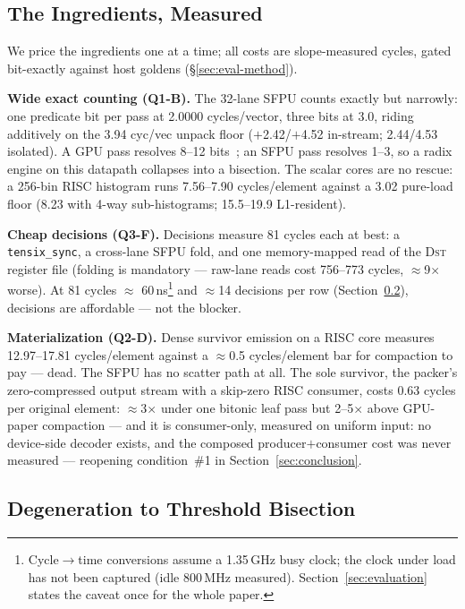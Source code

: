 \subsection{The Ingredients, Measured}
\label{sec:dspace-ingredients}

We price the ingredients one at a time; all costs are slope-measured
cycles, gated bit-exactly against host goldens (\S\ref{sec:eval-method}).

\textbf{Wide exact counting (Q1-B).}
The 32-lane SFPU counts exactly but narrowly: one predicate bit per pass
at 2.0000 cycles/vector, three bits at 3.0, riding additively on the 3.94
cyc/vec unpack floor ($+$2.42/$+$4.52 in-stream; 2.44/4.53 isolated). A
GPU pass
resolves 8--12 bits~\cite{alabi2012kselection,li2024radik}; an SFPU pass
resolves 1--3, so a radix engine on this datapath collapses into a
bisection. The scalar cores are no rescue: a 256-bin RISC histogram runs
7.56--7.90 cycles/element against a 3.02 pure-load floor (8.23 with
4-way sub-histograms; 15.5--19.9 L1-resident).

\textbf{Cheap decisions (Q3-F).}
Decisions measure 81 cycles each at best: a \texttt{tensix\_sync}, a
cross-lane SFPU fold, and one memory-mapped read of the \textsc{Dst}
register file (folding is mandatory --- raw-lane reads cost 756--773
cycles, $\approx$9$\times$ worse). At 81 cycles $\approx$ 60\,ns\footnote{%
Cycle$\to$time conversions assume a 1.35\,GHz busy clock; the clock under
load has not been captured (idle 800\,MHz measured).
Section~\ref{sec:evaluation} states the caveat once for the whole paper.}
and $\approx$14 decisions per row
(Section~\ref{sec:dspace-bisection}), decisions are affordable --- not
the blocker.

\textbf{Materialization (Q2-D).}
Dense survivor emission on a RISC core measures 12.97--17.81
cycles/element against a $\approx$0.5 cycles/element bar for compaction to
pay --- dead. The SFPU has no scatter path at all. The sole survivor, the
packer's zero-compressed output stream with a skip-zero RISC consumer,
costs 0.63 cycles per original element: $\approx$3$\times$ under one
bitonic leaf pass but 2--5$\times$ above GPU-paper compaction --- and it
is consumer-only, measured on uniform input: no device-side decoder
exists, and the composed producer$+$consumer cost was never measured ---
reopening condition~\#1 in Section~\ref{sec:conclusion}.

\subsection{Degeneration to Threshold Bisection}
\label{sec:dspace-bisection}

